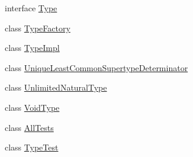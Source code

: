 \begin{DoxyCompactItemize}
\item 
interface \hyperlink{interfaceorg_1_1tzi_1_1use_1_1uml_1_1ocl_1_1type_1_1_type}{Type}
\item 
class \hyperlink{classorg_1_1tzi_1_1use_1_1uml_1_1ocl_1_1type_1_1_type_factory}{Type\-Factory}
\item 
class \hyperlink{classorg_1_1tzi_1_1use_1_1uml_1_1ocl_1_1type_1_1_type_impl}{Type\-Impl}
\item 
class \hyperlink{classorg_1_1tzi_1_1use_1_1uml_1_1ocl_1_1type_1_1_unique_least_common_supertype_determinator}{Unique\-Least\-Common\-Supertype\-Determinator}
\item 
class \hyperlink{classorg_1_1tzi_1_1use_1_1uml_1_1ocl_1_1type_1_1_unlimited_natural_type}{Unlimited\-Natural\-Type}
\item 
class \hyperlink{classorg_1_1tzi_1_1use_1_1uml_1_1ocl_1_1type_1_1_void_type}{Void\-Type}
\item 
class \hyperlink{classorg_1_1tzi_1_1use_1_1uml_1_1ocl_1_1type_1_1_all_tests}{All\-Tests}
\item 
class \hyperlink{classorg_1_1tzi_1_1use_1_1uml_1_1ocl_1_1type_1_1_type_test}{Type\-Test}
\end{DoxyCompactItemize}

